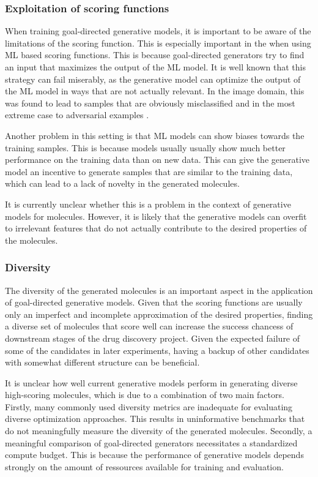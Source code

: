 \subsubsection{Exploitation of scoring functions}
When training goal-directed generative models, it is important to be aware of
the limitations of the scoring function. This is especially important in the
when using \ac{ML} based scoring functions. This is because goal-directed
generators try to find an input that maximizes the output of the \ac{ML} model.
It is well known that this strategy can fail miserably, as the generative model
can optimize the output of the \ac{ML} model in ways that are not actually
relevant. In the image domain, this was found to lead to samples that are
obviously misclassified and in the most extreme case to adversarial examples
\citep{brittle,adversarial}. 

Another problem in this setting is that \ac{ML} models can 
show biases towards the training samples. This is because 
models usually usually show much better performance on the training data than on
new data. This can give the generative model an incentive to generate samples 
that are similar to the training data, which can lead to a lack of novelty in
the generated molecules.

It is currently unclear whether this is a problem in the context of generative
models for molecules. However, it is likely that the generative models can
overfit to irrelevant features that do not actually contribute to the desired
properties of the molecules. 

\subsubsection{Diversity}
The diversity of the generated molecules is an important aspect in the
application of goal-directed generative models. Given that the scoring functions
are usually only an imperfect and incomplete approximation of the desired
properties, finding a diverse set of molecules that score well can increase the
success chancess of downstream stages of the drug discovery project. Given the
expected failure of some of the candidates in later experiments, having a backup
of other candidates with somewhat different structure can be beneficial.

It is unclear how well current generative models perform in generating diverse
high-scoring molecules, which is due to a combination of two main factors. 
Firstly, many commonly used diversity metrics are inadequate for evaluating
diverse optimization approaches. This results in uninformative benchmarks that
do not meaningfully measure the diversity of the generated molecules. Secondly,
a meaningful comparison of goal-directed generators necessitates a standardized
compute budget. This is because the performance of generative models depends strongly 
on the amount of ressources available for training and evaluation.

